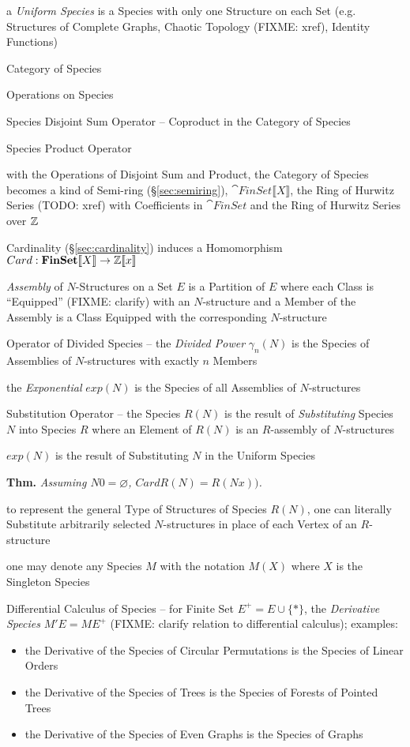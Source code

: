 a \emph{Uniform Species} is a Species with only one Structure on each Set (e.g.
Structures of Complete Graphs, Chaotic Topology (FIXME: xref), Identity
Functions)

Category of Species

Operations on Species

Species Disjoint Sum Operator -- Coproduct in the Category of Species

Species Product Operator

with the Operations of Disjoint Sum and Product, the
Category of Species becomes a kind of Semi-ring (\S\ref{sec:semiring}),
$\cat{FinSet}\llbracket{X}\rrbracket$, the Ring of Hurwitz Series (TODO: xref)
with Coefficients in $\cat{FinSet}$ and the Ring of Hurwitz Series over $\mathbb{Z}$

Cardinality (\S\ref{sec:cardinality}) induces a Homomorphism
$Card : \mathbf{FinSet}\llbracket{X}\rrbracket \rightarrow \mathbb{Z}\llbracket{x}\rrbracket$

\emph{Assembly} of $N$-Structures on a Set $E$ is a Partition of $E$ where each
Class is ``Equipped'' (FIXME: clarify) with an $N$-structure and a Member of the
Assembly is a Class Equipped with the corresponding $N$-structure

Operator of Divided Species -- the \emph{Divided Power} $\gamma_n(N)$ is the
Species of Assemblies of $N$-structures with exactly $n$ Members

the \emph{Exponential} $exp(N)$ is the Species of all Assemblies of
$N$-structures

Substitution Operator -- the Species $R(N)$ is the result of \emph{Substituting}
Species $N$ into Species $R$ where an Element of $R(N)$ is an $R$-assembly of
$N$-structures

$exp(N)$ is the result of Substituting $N$ in the Uniform Species

\textbf{Thm.} \emph{Assuming $N 0 = \varnothing$, $Card R(N) = R(N x))$.}

to represent the general Type of Structures of Species $R(N)$, one can literally
Substitute arbitrarily selected $N$-structures in place of each Vertex of an
$R$-structure

one may denote any Species $M$ with the notation $M(X)$ where $X$ is the
Singleton Species

Differential Calculus of Species -- for Finite Set $E^+ = E \cup \{*\}$, the
\emph{Derivative Species} $M' E = M E^+$
(FIXME: clarify relation to differential calculus); examples:
\begin{itemize}
  \item the Derivative of the Species of Circular Permutations is the Species of
    Linear Orders
  \item the Derivative of the Species of Trees is the Species of Forests of
    Pointed Trees
  \item the Derivative of the Species of Even Graphs is the Species of Graphs
\end{itemize}

